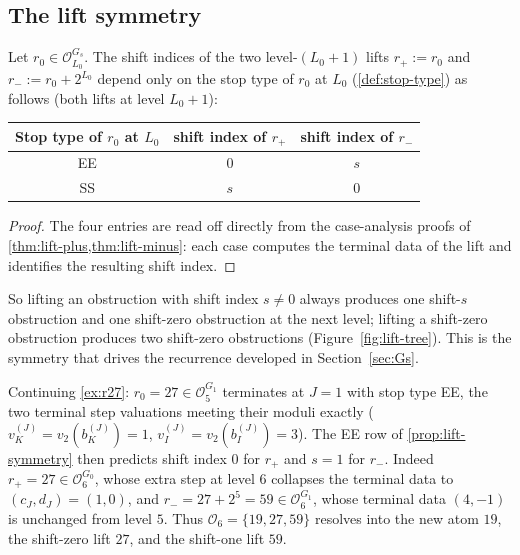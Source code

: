 \documentclass[11pt,reqno]{amsart}
\newcommand{\Obs}{\mathcal{O}}
\newcommand{\vk}{v_{K}}
\newcommand{\vi}{v_{I}}
\newcommand{\vtwo}{v_{2}}
\begin{document}
\subsection{The lift symmetry}

\begin{proposition}\label{prop:lift-symmetry}
Let $r_0 \in \Obs_{L_0}^{G_s}$. The shift indices of the two level-$(L_0+1)$
lifts $r_+ := r_0$ and $r_- := r_0 + 2^{L_0}$ depend only on the stop type
of $r_0$ at $L_0$ (\cref{def:stop-type}) as follows (both lifts
at level $L_0+1$):

\begin{center}
\begin{tabular}{c|cc}
\toprule
Stop type of $r_0$ at $L_0$ & shift index of $r_+$ & shift index of $r_-$ \\
\midrule
EE & $0$ & $s$ \\
SS & $s$ & $0$ \\
\bottomrule
\end{tabular}
\end{center}
\end{proposition}

\begin{proof}
The four entries are read off directly from the case-analysis proofs of
\cref{thm:lift-plus,thm:lift-minus}: each case
computes the terminal data of the lift and identifies the resulting
shift index. \qedhere
\end{proof}

So lifting an obstruction with shift index $s \ne 0$ always produces one
shift-$s$ obstruction and one shift-zero obstruction at the next level;
lifting a shift-zero obstruction produces two shift-zero obstructions
(Figure~\ref{fig:lift-tree}). This is the symmetry that drives the recurrence
developed in Section~\ref{sec:Gs}.

\begin{example}[The lift of $r = 27$]
\label{ex:lift27}
Continuing \cref{ex:r27}: $r_0 = 27 \in \Obs_5^{G_1}$ terminates at $J = 1$
with stop type EE, the two terminal step valuations meeting their moduli
exactly ($\vk^{(J)} = \vtwo(b_K^{(J)}) = 1$, $\vi^{(J)} = \vtwo(b_I^{(J)}) = 3$).
The EE row of \cref{prop:lift-symmetry} then predicts shift index $0$ for
$r_+$ and $s = 1$ for $r_-$. Indeed $r_+ = 27 \in \Obs_6^{G_0}$, whose extra
step at level $6$ collapses the terminal data to $(c_J, d_J) = (1, 0)$, and
$r_- = 27 + 2^5 = 59 \in \Obs_6^{G_1}$, whose terminal data $(4, -1)$ is
unchanged from level $5$. Thus $\Obs_6 = \{19, 27, 59\}$ resolves into the new
atom $19$, the shift-zero lift $27$, and the shift-one lift $59$.
\end{example}
\end{document}
